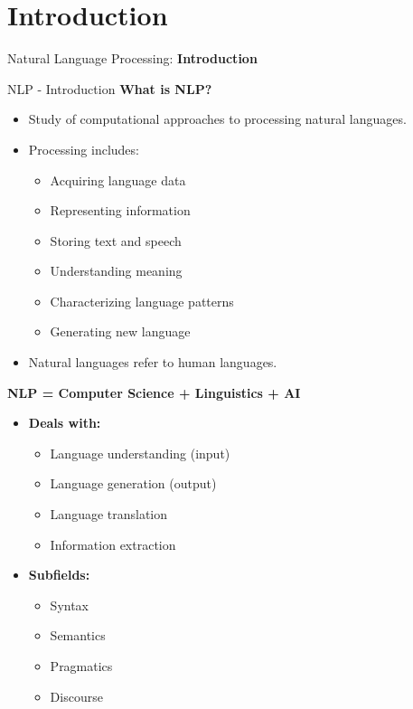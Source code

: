 \section{Introduction}
\begin{frame}{}
    \LARGE Natural Language Processing: \textbf{Introduction}
\end{frame}

\begin{frame}[allowframebreaks]{NLP - Introduction}
    \large \textbf{What is NLP?}
    \begin{itemize}
        \item Study of computational approaches to processing natural languages.
        \item Processing includes:
            \begin{itemize}
                \item Acquiring language data
                \item Representing information
                \item Storing text and speech
                \item Understanding meaning
                \item Characterizing language patterns
                \item Generating new language
            \end{itemize}
        \item Natural languages refer to human languages.
    \end{itemize}
\framebreak
    \begin{figure}
        \centering
    \end{figure}
\framebreak
    {\large \textbf{NLP = Computer Science + Linguistics + AI}}

    \begin{itemize}
        \item \textbf{Deals with:}
        \begin{itemize}
            \item Language understanding (input)
            \item Language generation (output)
            \item Language translation
            \item Information extraction
        \end{itemize}
        \item \textbf{Subfields:}
        \begin{itemize}
            \item Syntax
            \item Semantics
            \item Pragmatics
            \item Discourse
        \end{itemize}
    \end{itemize}
\end{frame}

